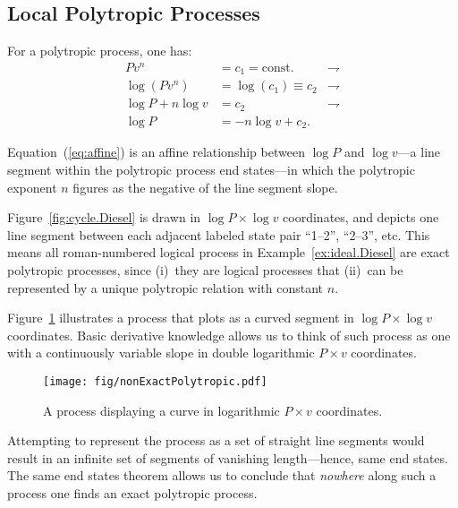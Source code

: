 \documentclass[fleqn,10pt]{SelfArx}
\begin{document}
    \subsection{Local Polytropic Processes}

    For a polytropic process, one has: %
    \begin{align}
        Pv^n & = c_1 = \text{const.}        & \rightharpoondown\\
        \log(Pv^n) & = \log(c_1) \equiv c_2 & \rightharpoondown\\
        \log P + n\log v & = c_2            & \rightharpoondown\\
        \log P & = -n\log v + c_2. \label{eq:affine}
    \end{align}

    Equation~(\ref{eq:affine}) is an affine relationship between $\log P$ and $\log v$---a  line
    segment within the polytropic process end states---in  which  the  polytropic  exponent  $n$
    figures as the negative of the line segment slope.

    Figure~\ref{fig:cycle.Diesel} is drawn in $\log P \times \log v$  coordinates,  and  depicts
    one line segment between each adjacent labeled state  pair  ``1--2'',  ``2--3'',  etc.  This
    means  all  roman-numbered  logical  process  in  Example~\ref{ex:ideal.Diesel}  are   exact
    polytropic processes, since (i)~they are logical processes that (ii)~can be represented by a
    unique polytropic relation with constant $n$.

    Figure~\ref{fig:non.exact} illustrates a process that plots as a curved segment in  $\log  P
    \times \log v$ coordinates. Basic derivative knowledge allows us to think of such process as
    one with a continuously variable slope in double logarithmic $P\times v$ coordinates.

    \begin{figure}[ht]
        \centering
        \texttt{[image: fig/nonExactPolytropic.pdf]}
        \caption{A process displaying a curve in logarithmic $P\times v$ coordinates.}
        \label{fig:non.exact}
    \end{figure}

    Attempting to represent the process as a set of straight line segments would  result  in  an
    infinite set of segments of vanishing length---hence, same end states. The same  end  states
    theorem allows us to conclude that \emph{nowhere} along such a process one  finds  an  exact
    polytropic process.
\end{document}
